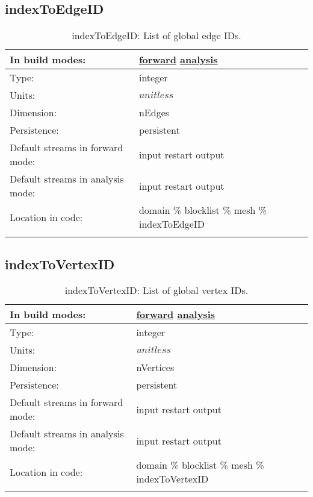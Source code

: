 \subsection[indexToEdgeID]{indexToEdgeID}
\label{subsec:var_sec_mesh_indexToEdgeID}
\begin{center}
\begin{longtable}{| p{2.0in} | p{4.0in} |}
        \hline 
        In build modes: & \hyperref[subsec:forward_var_tab_mesh]{forward} \hyperref[subsec:analysis_var_tab_mesh]{analysis} \\
        \hline 
        Type: & integer \\
        \hline 
        Units: & $unitless$ \\
        \hline 
        Dimension: & nEdges \\
        \hline 
        Persistence: & persistent \\
        \hline 
		 Default streams in forward mode: &  input restart output \\
        \hline 
		 Default streams in analysis mode: &  input restart output \\
        \hline 
		 Location in code: & domain \% blocklist \% mesh \% indexToEdgeID \\
		 \hline 
    \caption{indexToEdgeID: List of global edge IDs.}
\end{longtable}
\end{center}
\subsection[indexToVertexID]{indexToVertexID}
\label{subsec:var_sec_mesh_indexToVertexID}
\begin{center}
\begin{longtable}{| p{2.0in} | p{4.0in} |}
        \hline 
        In build modes: & \hyperref[subsec:forward_var_tab_mesh]{forward} \hyperref[subsec:analysis_var_tab_mesh]{analysis} \\
        \hline 
        Type: & integer \\
        \hline 
        Units: & $unitless$ \\
        \hline 
        Dimension: & nVertices \\
        \hline 
        Persistence: & persistent \\
        \hline 
		 Default streams in forward mode: &  input restart output \\
        \hline 
		 Default streams in analysis mode: &  input restart output \\
        \hline 
		 Location in code: & domain \% blocklist \% mesh \% indexToVertexID \\
		 \hline 
    \caption{indexToVertexID: List of global vertex IDs.}
\end{longtable}
\end{center}
